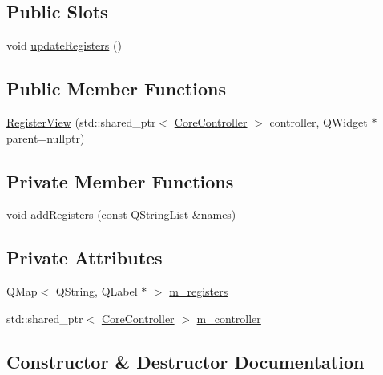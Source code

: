 \subsection*{Public Slots}
\begin{DoxyCompactItemize}
\item 
void \mbox{\hyperlink{class_q_g_b_a_1_1_register_view_a55d810f77782e3f17b96a62f8cd4561a}{update\+Registers}} ()
\end{DoxyCompactItemize}
\subsection*{Public Member Functions}
\begin{DoxyCompactItemize}
\item 
\mbox{\hyperlink{class_q_g_b_a_1_1_register_view_a34ed2c1fb824ee2e61c6c57e85dc4d7d}{Register\+View}} (std\+::shared\+\_\+ptr$<$ \mbox{\hyperlink{class_q_g_b_a_1_1_core_controller}{Core\+Controller}} $>$ controller, Q\+Widget $\ast$parent=nullptr)
\end{DoxyCompactItemize}
\subsection*{Private Member Functions}
\begin{DoxyCompactItemize}
\item 
void \mbox{\hyperlink{class_q_g_b_a_1_1_register_view_a221b8e5f09c2741bd56daf14786bf284}{add\+Registers}} (const Q\+String\+List \&names)
\end{DoxyCompactItemize}
\subsection*{Private Attributes}
\begin{DoxyCompactItemize}
\item 
Q\+Map$<$ Q\+String, Q\+Label $\ast$ $>$ \mbox{\hyperlink{class_q_g_b_a_1_1_register_view_aca0407ad2db187447ea14f8e3ac82c8d}{m\+\_\+registers}}
\item 
std\+::shared\+\_\+ptr$<$ \mbox{\hyperlink{class_q_g_b_a_1_1_core_controller}{Core\+Controller}} $>$ \mbox{\hyperlink{class_q_g_b_a_1_1_register_view_a10a3ba4dc8dd87f77375cbe78f3397fc}{m\+\_\+controller}}
\end{DoxyCompactItemize}


\subsection{Constructor \& Destructor Documentation}
\mbox{\label{class_q_g_b_a_1_1_register_view_a34ed2c1fb824ee2e61c6c57e85dc4d7d}} 
